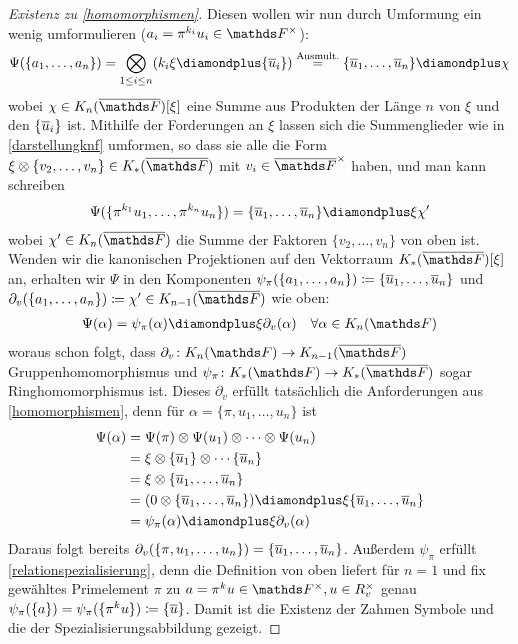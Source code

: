 \documentclass[ngerman,fontsize=11pt, paper=a4, parskip=half, titlepage=true, toc=bib]{scrartcl}
\begin{document}
\begin{proof}[Existenz zu \ref{homomorphismen}]
  Diesen wollen wir nun durch Umformung ein wenig umformulieren
  ($a_i=\pi^{k_i}u_i\in\Fx$):
  \begin{gather*}
    \Psi(\{a_1,\dotsc,a_n\})
    =\bigotimes_{1\leq i\leq n}(k_i\xi\p\{\ov u_i\})
    \overset{\text{Ausmult.}}{=}
    \{\ov u_1,\dotsc,\ov u_n\}\p \chi
  \end{gather*}
  wobei $\chi\in\KnbF[\xi]$ eine Summe aus Produkten der Länge $n$ 
  von $\xi$ und den $\{\overline u_i\}$ ist.
  Mithilfe der Forderungen an $\xi$  lassen sich die Summenglieder 
  wie in \ref{darstellungknf} umformen, so dass sie alle die Form
  $\xi\otimes\{v_2,\dotsc, v_n\}\in\KbF$ mit $v_i\in\bFx$
  haben,
  und man kann schreiben
  \begin{gather*}
    \Psi(\{\pi^{k_1}u_1,\dotsc,\pi^{k_n}u_n\}) 
    = \{\ov u_1,\dotsc,\ov u_n\}\p \xi\chi'
  \end{gather*}
  wobei $\chi'\in\KnbF$ die Summe der Faktoren $\{v_2,\dotsc,v_n\}$
  von oben ist.
  Wenden wir die kanonischen Projektionen auf den Vektorraum 
  $\KbF[\xi]$ an, erhalten wir $\Psi$ in den Komponenten
  $\psi_\pi(\{a_1,\dotsc,a_n\})\coloneqq \{\overline u_1,\dotsc,\overline u_n\}$
  und $\partial_v(\{a_1,\dotsc,a_n\})\coloneqq \chi'\in\K_{n-1}(\bF)$ wie oben:
  \begin{gather*}
    \Psi(\alpha) = \psi_\pi(\alpha)\p \xi\partial_v(\alpha)
    \quad \forall\alpha\in\KnF
  \end{gather*}
  woraus schon folgt, 
  dass $\partial_v\colon\KnF\to\K_{n-1}(\bF)$ Gruppenhomomorphismus 
  und $\psi_\pi\colon\KF\to\KbF$ sogar Ringhomomorphismus ist.
  Dieses $\partial_v$ erfüllt tatsächlich die Anforderungen aus 
  \ref{homomorphismen}, denn für $\alpha=\{\pi,u_1,\dotsc, u_n\}$ ist
  \begin{align*}
    \Psi(\alpha)
    &=\Psi(\pi)\otimes\Psi(u_1)\otimes\dotsb\otimes\Psi(u_n)\\
    &=\xi\otimes\{\ov u_1\}\otimes\dotsb\{\ov u_n\}\\
    &=\xi\otimes\{\ov u_1,\dotsc,\ov u_n\}\\
    &=(0\otimes\{\ov u_1,\dotsc,\ov u_n\})
      \p\xi\{\ov u_1,\dotsc,\ov u_n\}\\
    &=\psi_\pi(\alpha) \p \xi\partial_v(\alpha)
  \end{align*}
  Daraus folgt bereits
  $\partial_v(\{\pi,u_1,\dotsc,u_n\})=\{\overline u_1,\dotsc,\overline u_n\}$.  
  Außerdem $\psi_\pi$ erfüllt \ref{relationspezialisierung}, denn 
  die Definition von oben liefert für $n=1$ und fix gewähltes
  Primelement $\pi$ zu $a=\pi^ku\in\Fx, u\in\Rx_v$ genau
  $\psi_\pi(\{a\})=\psi_\pi(\{\pi^ku\})\coloneqq\{\overline u\}$.
  Damit ist die Existenz der Zahmen Symbole und die der
  Spezialisierungsabbildung gezeigt.
\end{proof}
\end{document}

